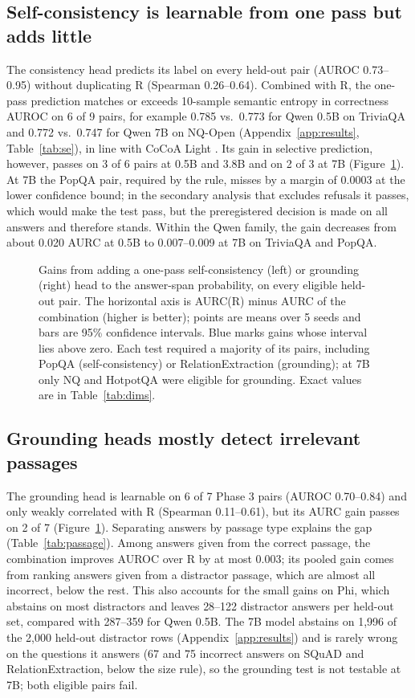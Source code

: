 \documentclass[10pt]{article}
\begin{document}
\subsection{Self-consistency is learnable from one pass but adds little}
\label{sec:consistency}

The consistency head predicts its label on every held-out pair (AUROC 0.73--0.95) without duplicating R (Spearman 0.26--0.64). Combined with R, the one-pass prediction matches or exceeds 10-sample semantic entropy in correctness AUROC on 6 of 9 pairs, for example 0.785 vs.\ 0.773 for Qwen 0.5B on TriviaQA and 0.772 vs.\ 0.747 for Qwen 7B on NQ-Open (Appendix~\ref{app:results}, Table~\ref{tab:se}), in line with CoCoA Light \citep{vashurin2025cocoa}. Its gain in selective prediction, however, passes on 3 of 6 pairs at 0.5B and 3.8B and on 2 of 3 at 7B (Figure~\ref{fig:dims}). At 7B the PopQA pair, required by the rule, misses by a margin of 0.0003 at the lower confidence bound; in the secondary analysis that excludes refusals it passes, which would make the test pass, but the preregistered decision is made on all answers and therefore stands. Within the Qwen family, the gain decreases from about 0.020 AURC at 0.5B to 0.007--0.009 at 7B on TriviaQA and PopQA.

\begin{figure}[t]
\centering

\caption{Gains from adding a one-pass self-consistency (left) or grounding (right) head to the answer-span probability, on every eligible held-out pair. The horizontal axis is AURC(R) minus AURC of the combination (higher is better); points are means over 5 seeds and bars are 95\% confidence intervals. Blue marks gains whose interval lies above zero. Each test required a majority of its pairs, including PopQA (self-consistency) or RelationExtraction (grounding); at 7B only NQ and HotpotQA were eligible for grounding. Exact values are in Table~\ref{tab:dims}.}
\label{fig:dims}
\end{figure}

\subsection{Grounding heads mostly detect irrelevant passages}
\label{sec:grounding}

The grounding head is learnable on 6 of 7 Phase 3 pairs (AUROC 0.70--0.84) and only weakly correlated with R (Spearman 0.11--0.61), but its AURC gain passes on 2 of 7 (Figure~\ref{fig:dims}). Separating answers by passage type explains the gap (Table~\ref{tab:passage}). Among answers given from the correct passage, the combination improves AUROC over R by at most 0.003; its pooled gain comes from ranking answers given from a distractor passage, which are almost all incorrect, below the rest. This also accounts for the small gains on Phi, which abstains on most distractors and leaves 28--122 distractor answers per held-out set, compared with 287--359 for Qwen 0.5B. The 7B model abstains on 1,996 of the 2,000 held-out distractor rows (Appendix~\ref{app:results}) and is rarely wrong on the questions it answers (67 and 75 incorrect answers on SQuAD and RelationExtraction, below the size rule), so the grounding test is not testable at 7B; both eligible pairs fail.
\end{document}
